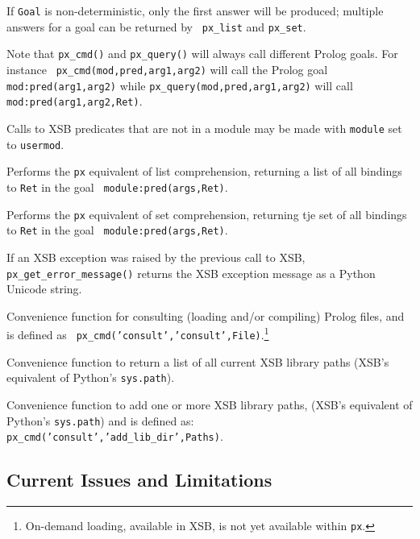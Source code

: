\begin{description}
     If {\tt Goal} is non-deterministic, only the first answer will be
     produced; multiple answers for a goal can be returned by {\tt
       px\_list} and {\tt px\_set}.

     Note that {\tt px\_cmd()} and {\tt px\_query()} will always call
     different Prolog goals.  For instance {\tt
       px\_cmd(mod,pred,arg1,arg2)} will call the Prolog goal {\tt
       mod:pred(arg1,arg2)} while {\tt px\_query(mod,pred,arg1,arg2)}
     will call {\tt mod:pred(arg1,arg2,Ret)}.
     
     Calls to XSB predicates that are not in a module may be made with
     {\tt module} set to {\tt usermod}.

%
  Performs the {\tt px} equivalent of list comprehension, returning a
  list of all bindings to {\tt Ret} in the goal {\tt
    module:pred(args,Ret)}.
  
%
  Performs the {\tt px} equivalent of set comprehension, returning tje
  set of all bindings to {\tt Ret} in the goal {\tt
    module:pred(args,Ret)}.

%
  If an XSB exception was raised by the previous call to XSB, {\tt
    px\_get\_error\_message()} returns the XSB exception message as a
  Python Unicode string.
  
%
  Convenience function for consulting (loading and/or compiling)
  Prolog files, and is defined as {\tt
    px\_cmd('consult','consult',File)}.\footnote{On-demand loading,
    available in XSB, is not yet available within {\tt px}.}

%  
  Convenience function to return a list of all current XSB library
  paths (XSB's equivalent of Python's {\tt sys.path}).

%  
    Convenience function to add one or more XSB library paths, (XSB's
    equivalent of Python's {\tt sys.path}) and is defined as: {\tt
      px\_cmd('consult','add\_lib\_dir',Paths)}.
  
\end{description}

\subsection{Current Issues and Limitations}

